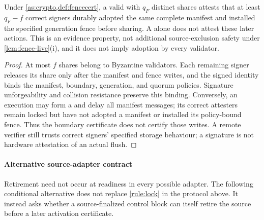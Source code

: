 \begin{proposition}
\label{prop:retirement-evidence}
Under \cref{as:crypto,def:fencecert}, a valid \FenceCert{} with $q_F$ distinct shares attests that
at least $q_F-f$ correct signers durably adopted the same complete manifest and installed the
specified generation fence before sharing. A \CutCert{} alone does not attest these later actions.
This is an evidence property, not additional source-exclusion safety under
\cref{lem:fence-live}(i), and it does not imply adoption by every validator.
\end{proposition}
\begin{proof}
At most $f$ shares belong to Byzantine validators. Each remaining signer releases its share only
after the manifest and fence writes, and the signed identity binds the manifest, boundary,
generation, and quorum policies. Signature unforgeability and collision resistance preserve this
binding. Conversely, an execution may form a \CutCert{} and delay all manifest messages; its correct
attesters remain locked but have not adopted a manifest or installed its policy-bound fence. Thus
the boundary certificate does not certify those writes. A remote verifier still trusts correct
signers' specified storage behaviour; a signature is not hardware attestation of an actual flush.
\end{proof}

\paragraph{Alternative source-adapter contract}
Retirement need not occur at readiness in every possible adapter. The following conditional
alternative does not replace \cref{rule:lock} in the protocol above. It instead asks whether a
source-finalized control block can itself retire the source before a later activation certificate.

